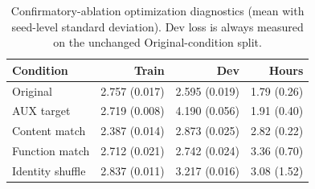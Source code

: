 \begin{table}[tb]
\centering
\small
\setlength{\tabcolsep}{2.5pt}
\begin{tabular}{lrrr}
\toprule
Condition & Train & Dev & Hours \\
\midrule
Original & 2.757 (0.017) & 2.595 (0.019) & 1.79 (0.26) \\
AUX target & 2.719 (0.008) & 4.190 (0.056) & 1.91 (0.40) \\
Content match & 2.387 (0.014) & 2.873 (0.025) & 2.82 (0.22) \\
Function match & 2.712 (0.021) & 2.742 (0.024) & 3.36 (0.70) \\
Identity shuffle & 2.837 (0.011) & 3.217 (0.016) & 3.08 (1.52) \\
\bottomrule
\end{tabular}
\caption{Confirmatory-ablation optimization diagnostics (mean with seed-level standard deviation). Dev loss is always measured on the unchanged Original-condition split.}
\label{tab:training-diagnostics}
\end{table}
